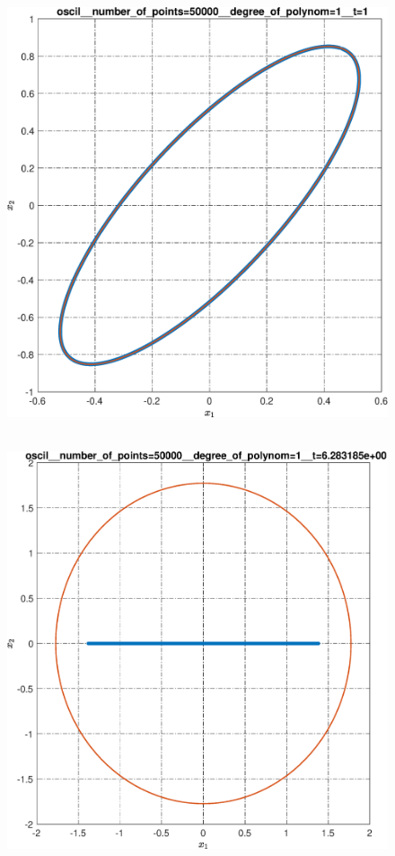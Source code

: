 \documentclass[../main.tex]{subfiles}
\begin{document}
\begin{figure}[ht!]
\begin{minipage}[b]{.3\linewidth}
 		\includegraphics[width=\linewidth]{images/oscil__number_of_points=50000__degree_of_polynom=1__t=1.eps}
 		\label{fig:ap:oscilN5104k1T1}
 	\end{minipage} 
 	\hfill
 	\begin{minipage}[b]{.3\linewidth} 
 		\small
 		\centering
 		\includegraphics[width=\linewidth]{images/oscil__number_of_points=50000__degree_of_polynom=1__t=2pi.eps}

\end{minipage}
\end{figure}
\end{document}

